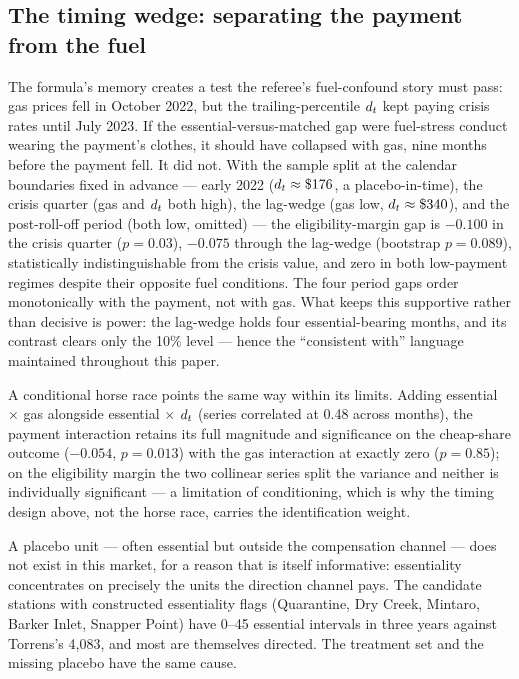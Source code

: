 \subsection{The timing wedge: separating the payment from the fuel}

The formula's memory creates a test the referee's fuel-confound story must
pass: gas prices fell in October 2022, but the trailing-percentile $d_t$
kept paying crisis rates until July 2023. If the essential-versus-matched
gap were fuel-stress conduct wearing the payment's clothes, it should have
collapsed with gas, nine months before the payment fell. It did not. With
the sample split at the calendar boundaries fixed in advance --- early 2022
($d_t\approx\$176$, a placebo-in-time), the crisis quarter (gas and $d_t$
both high), the lag-wedge (gas low, $d_t\approx\$340$), and the
post-roll-off period (both low, omitted) --- the eligibility-margin gap is
$-0.100$ in the crisis quarter ($p=0.03$), $-0.075$ through the lag-wedge
(bootstrap $p=0.089$), statistically indistinguishable from the crisis
value, and zero in both low-payment regimes despite their opposite fuel
conditions. The four period gaps order monotonically with the payment, not
with gas. What keeps this supportive rather than decisive is power: the
lag-wedge holds four essential-bearing months, and its contrast clears only
the 10\% level --- hence the ``consistent with'' language maintained
throughout this paper.

A conditional horse race points the same way within its limits. Adding
essential $\times$ gas alongside essential $\times$ $d_t$ (series
correlated at 0.48 across months), the payment interaction retains its full
magnitude and significance on the cheap-share outcome ($-0.054$, $p=0.013$)
with the gas interaction at exactly zero ($p=0.85$); on the eligibility
margin the two collinear series split the variance and neither is
individually significant --- a limitation of conditioning, which is why the
timing design above, not the horse race, carries the identification weight.

A placebo unit --- often essential but outside the compensation channel ---
does not exist in this market, for a reason that is itself informative:
essentiality concentrates on precisely the units the direction channel
pays. The candidate stations with constructed essentiality flags
(Quarantine, Dry Creek, Mintaro, Barker Inlet, Snapper Point) have 0--45
essential intervals in three years against Torrens's 4,083, and most are
themselves directed. The treatment set and the missing placebo have the
same cause.

